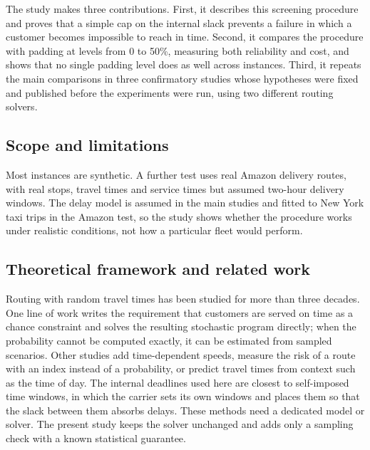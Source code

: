 \documentclass[12pt,letterpaper]{article}
\begin{document}
The study makes three contributions. First, it describes this screening procedure
and proves that a simple cap on the internal slack prevents a failure in which a
customer becomes impossible to reach in time. Second, it compares the procedure
with padding at levels from 0 to 50\%, measuring both reliability and cost, and
shows that no single padding level does as well across instances. Third, it
repeats the main comparisons in three confirmatory studies whose hypotheses were
fixed and published before the experiments were run, using two different routing
solvers.

\subsection{Scope and limitations}

Most instances are synthetic. A further test uses \AmzRoutes{} real Amazon delivery routes,
with real stops, travel times and service times but assumed two-hour delivery
windows. The delay model is assumed in the main studies and fitted to New York taxi trips
in the Amazon test, so the study shows whether the procedure works under
realistic conditions, not how a particular fleet would perform.

\subsection{Theoretical framework and related work}

Routing with random travel times has been studied for more than three
decades\cite{laporte1992,gendreau1996,kenyon2003}. One line of work writes the
requirement that customers are served on time as a chance constraint and solves the
resulting stochastic program directly\cite{li2010,ehmke2015}; when the probability
cannot be computed exactly, it can be estimated from sampled
scenarios\cite{ahmed2008}. Other studies add time-dependent
speeds\cite{tas2014,bomboi2022}, measure the risk of a route with an index instead
of a probability\cite{jaillet2016,zhang2019}, or predict travel times from context
such as the time of day\cite{serrano2026}. The internal deadlines used here are
closest to self-imposed time windows, in which the carrier sets its own windows and
places them so that the slack between them absorbs delays\cite{jabali2015,vareias2019}.
These methods need a dedicated model or solver. The present study keeps the solver
unchanged and adds only a sampling check with a known statistical
guarantee\cite{wilson1927,brown2001}.
\end{document}
